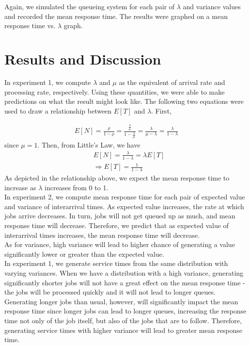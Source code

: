 \documentclass[12pt]{article}
\begin{document}
Again, we simulated the queueing system for each pair of $\lambda$ and variance values and recorded the mean response time. The results were graphed on a mean response time vs. $\lambda$ graph. 

\section{Results and Discussion} 
In experiment 1, we compute $\lambda$ and $\mu$ as the equivalent of arrival rate and processing rate, respectively. Using these quantities, we were able to make predictions on what the result might look like. The following two equations were used to draw a relationship between $E[T]$ and $\lambda$. First,

\begin{align*}
E[N] = \frac{\rho}{1 - \rho} = \frac{\frac{\lambda}{\mu}}{1 - \frac{\lambda}{\mu}} = \frac{\lambda}{\mu - \lambda} = \frac{\lambda}{1 - \lambda}
\end{align*}
since $\mu = 1$. Then, from Little's Law, we have 
\begin{align*}
&E[N] = \frac{\lambda}{1 - \lambda} = \lambda E[T] \\ 
&\Rightarrow 
E[T] = \frac{1}{1 - \lambda}
\end{align*}
As depicted in the relationship above, we expect the mean response time to increase as $\lambda$ increases from 0 to 1. \\

In experiment 2, we compute mean response time for each pair of expected value and variance of interarrival times. As expected value increases, the rate at which jobs arrive decreases. In turn, jobs will not get queued up as much, and mean response time will decrease. Therefore, we predict that as expected value of interarrival times increases, the mean response time will decrease. \\

As for variance, high variance will lead to higher chance of generating a value significantly lower or greater than the expected value. \\

In experiment 1, we generate service times from the same distribution with varying variances. When we have a distribution with a high variance, generating significantly shorter jobs will not have a great effect on the mean response time - the jobs will be processed quickly and it will not lead to longer queues. Generating longer jobs than usual, however, will significantly impact the mean response time since longer jobs can lead to longer queues, increasing the response time not only of the job itself, but also of the jobs that are to follow. Therefore, generating service times with higher variance will lead to greater mean response time. \\ 
\end{document}
